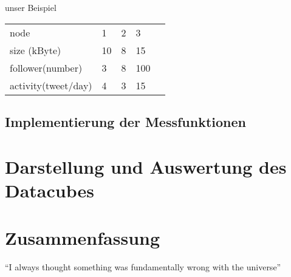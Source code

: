 \documentclass{article}
\begin{document}
unser Beispiel

\begin{table}[h]
\begin{tabular}{|l|l|l|l|l}
\cline{1-4}
node           & 1  & 2 & 3   &  \\ \cline{1-4}
size (kByte)   & 10 & 8 & 15  &  \\ \cline{1-4}
follower(number)       & 3  & 8 & 100 &  \\ \cline{1-4}
activity(tweet/day) & 4  & 3 & 15  &  \\ \cline{1-4}
\end{tabular}
\end{table}

\subsection{Implementierung der Messfunktionen}

\section{Darstellung und Auswertung des Datacubes}

\section{Zusammenfassung}
``I always thought something was fundamentally wrong with the universe'' \citep{adams1995hitchhiker}



\end{document}
